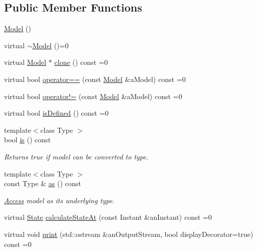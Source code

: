 \subsection*{Public Member Functions}
\begin{DoxyCompactItemize}
\item 
\hyperlink{classostk_1_1astro_1_1trajectory_1_1_model_aed4bcf4fbd44f69e97d8ff98112aa0f5}{Model} ()
\item 
virtual \hyperlink{classostk_1_1astro_1_1trajectory_1_1_model_a23acd7acccf729d8343180b83fe2f9f9}{$\sim$\+Model} ()=0
\item 
virtual \hyperlink{classostk_1_1astro_1_1trajectory_1_1_model}{Model} $\ast$ \hyperlink{classostk_1_1astro_1_1trajectory_1_1_model_ad9f1467f711b07796ddc1437fb9ad9df}{clone} () const =0
\item 
virtual bool \hyperlink{classostk_1_1astro_1_1trajectory_1_1_model_a874f79846e845859c070ce1b9874fc9c}{operator==} (const \hyperlink{classostk_1_1astro_1_1trajectory_1_1_model}{Model} \&a\+Model) const =0
\item 
virtual bool \hyperlink{classostk_1_1astro_1_1trajectory_1_1_model_a2dd77b9f6939d738f3a489f26c955340}{operator!=} (const \hyperlink{classostk_1_1astro_1_1trajectory_1_1_model}{Model} \&a\+Model) const =0
\item 
virtual bool \hyperlink{classostk_1_1astro_1_1trajectory_1_1_model_a0d5cf6f754905f06c0ec1e39618c20a1}{is\+Defined} () const =0
\item 
{\footnotesize template$<$class Type $>$ }\\bool \hyperlink{classostk_1_1astro_1_1trajectory_1_1_model_aedde1c01efbf407cca64b3f18b1a60f2}{is} () const
\begin{DoxyCompactList}\small\item\em Returns true if model can be converted to type. \end{DoxyCompactList}\item 
{\footnotesize template$<$class Type $>$ }\\const Type \& \hyperlink{classostk_1_1astro_1_1trajectory_1_1_model_a53365ee40062f5571b664998a56701e3}{as} () const
\begin{DoxyCompactList}\small\item\em \hyperlink{classostk_1_1astro_1_1_access}{Access} model as its underlying type. \end{DoxyCompactList}\item 
virtual \hyperlink{classostk_1_1astro_1_1trajectory_1_1_state}{State} \hyperlink{classostk_1_1astro_1_1trajectory_1_1_model_ad25eeaded2946bf73d44161b5f4e9a0e}{calculate\+State\+At} (const Instant \&an\+Instant) const =0
\item 
virtual void \hyperlink{classostk_1_1astro_1_1trajectory_1_1_model_a4b2098483430a820481ed50b81656e31}{print} (std\+::ostream \&an\+Output\+Stream, bool display\+Decorator=true) const =0
\end{DoxyCompactItemize}
